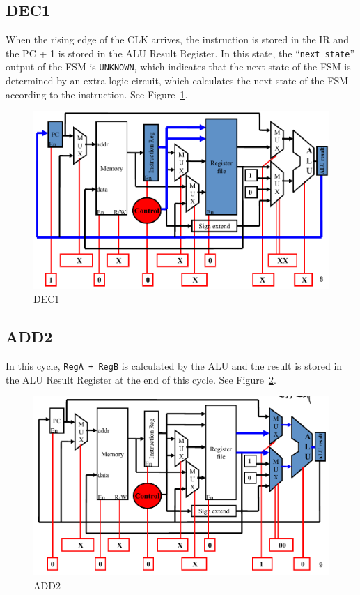 \documentclass[a4paper]{article}
\begin{document}
\subsection{DEC1}\label{dec1}
When the rising edge of the CLK arrives, the instruction is stored in the IR and the PC + 1 is stored in the ALU Result Register.
In this state, the ``\verb|next state|'' output of the FSM is \verb|UNKNOWN|, which indicates that the next state of the FSM is
determined by an extra logic circuit, which calculates the next state of the FSM according to the instruction.
See Figure~\ref{fig:dec1}.
\begin{figure}[ht!]
    \center
    \includegraphics[scale=0.4]{dec1}
    \caption{DEC1}\label{fig:dec1}
\end{figure}

\subsection{ADD2}\label{add2}
In this cycle, \verb|RegA + RegB| is calculated by the ALU and the result is stored in the ALU Result Register at the end of this
cycle. See Figure~\ref{fig:add2}.
\begin{figure}[ht!]
    \center
    \includegraphics[scale=0.4]{add2}
    \caption{ADD2}\label{fig:add2}
\end{figure}
\end{document}
